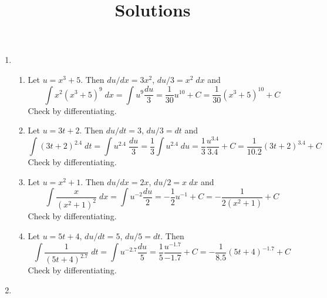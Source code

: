 \documentclass{article}
\title{\commonPSTitleZeroFourFive\ Solutions}
\author{\commonAuthor}
\date{\commonDateZeroFourFive}
\begin{document}
\maketitle
\begin{enumerate}
\item
  \begin{enumerate}
  \item Let $u=x^3+5$.  Then $du/dx = 3x^2$, $du/3 = x^2 \; dx$ and
    \begin{equation*}
      \int x^2(x^3+5)^9 \; dx = \int u^9 \frac{du}{3} = \frac{1}{30} u^{10} + C
      = \frac{1}{30} (x^3+5)^{10} + C
    \end{equation*}
    Check by differentiating.
  \item Let $u=3t+2$.  Then $du/dt = 3$, $du/3 = dt$ and
    \begin{equation*}
      \int (3t+2)^{2.4} \; dt = \int u^{2.4} \; \frac{du}{3}
      = \frac{1}{3} \int u^{2.4} \; du = \frac{1}{3}
      \frac{u^{3.4}}{3.4} + C = \frac{1}{10.2} (3t+2)^{3.4} + C
    \end{equation*}
    Check by differentiating.
  \item Let $u=x^2+1$.  Then $du/dx = 2x$, $du/2 = x\; dx$ and
    \begin{equation*}
      \int \frac{x}{(x^2+1)^2} \; dx = \int u^{-2} \frac{du}{2}
      = -\frac{1}{2} u^{-1} + C = -\frac{1}{2(x^2+1)} + C
    \end{equation*}
    Check by differentiating.
  \item Let $u=5t+4$, $du/dt = 5$, $du/5 = dt$.  Then
    \begin{equation*}
      \int \frac{1}{(5t+4)^{2.7}} \; dt
      = \int u^{-2.7} \frac{du}{5}
      = \frac{1}{5} \frac{u^{-1.7}}{-1.7} + C
      = -\frac{1}{8.5} (5t+4)^{-1.7} + C
    \end{equation*}
    Check by differentiating.
  \end{enumerate}
\item
\end{enumerate}
\end{document}
